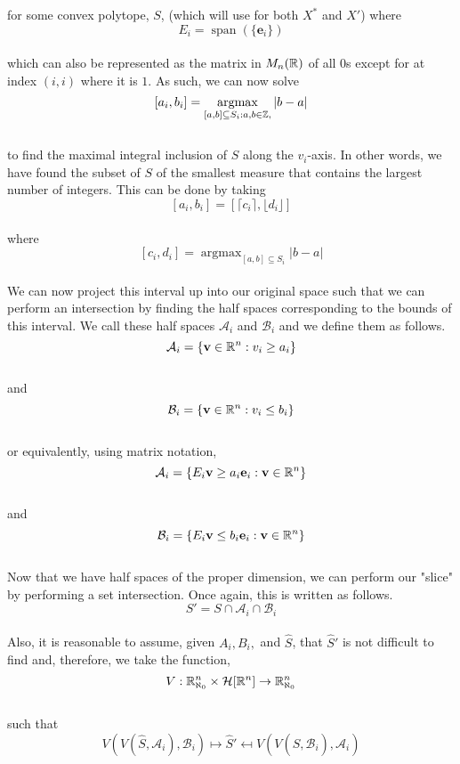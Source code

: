 \documentclass[conference]{IEEEtran}
\numberwithin{equation}{section}
\numberwithin{figure}{section}
\theoremstyle{plain}
\theoremstyle{definition}
\newcommand{\R}{\ensuremath \mathbb{R}}
\newcommand{\Z}{\ensuremath \mathbb{Z}}
\newcommand{\1}{\ensuremath \mathbbm{1}}
\newcommand{\Half}{\ensuremath \mathcal{H}}
\DeclareMathOperator{\vspan}{span}
\DeclareMathOperator{\argmax}{argmax}
\begin{document}
for some convex polytope, $S$, (which will use for both $X^*$ and $X'$) where \\
\[E_i = \vspan(\{\mathbf{e}_i\})\] \\
which can also be represented as the matrix in $M_n(\R)$ of all $0$s except for 
at index $(i,i)$ where it is $1$. As such, we can now solve \\
\[[a_i,b_i] = \argmax_{[a,b] \subseteq S_i : a,b \in \Z, }|b-a|\] \\
to find the maximal integral inclusion of $S$ along the $v_i$-axis. In other 
words, we have found the subset of $S$ of the smallest measure that contains the 
largest number of integers. This can be done by taking \\ 
\[[a_i,b_i] = [\lceil c_i \rceil,\lfloor d_i \rfloor]\] \\
where \\
\[[c_i,d_i] = \argmax_{[a,b] \subseteq S_i}|b-a|\] \\
We can now project this interval up into our original 
space such that we can perform an intersection by finding the half spaces 
corresponding to the bounds of this interval. We call these half spaces 
$\mathcal{A}_i$ and $\mathcal{B}_i$ and we define them as follows. \\
\[\mathcal{A}_i = \{\mathbf{v} \in \R^n : v_i \geq a_i\}\] \\
and \\
\[\mathcal{B}_i = \{\mathbf{v} \in \R^n : v_i \leq b_i\}\] \\
or equivalently, using matrix notation, \\
\[\mathcal{A}_i = \{E_i\mathbf{v} \geq a_i\mathbf{e}_i : \mathbf{v} \in \R^n\}\] \\
and \\
\[\mathcal{B}_i = \{E_i\mathbf{v} \leq b_i\mathbf{e}_i : \mathbf{v} \in \R^n\}\] \\
Now that we have half spaces of the proper dimension, we can perform our "slice" 
by performing a set intersection. Once again, this is written as follows. \\
\[S' = S \cap \mathcal{A}_i \cap \mathcal{B}_i\] \\
Also, it is reasonable to assume, given $A_i,B_i,$ and $\hat{S}$, that $\hat{S}'$ 
is not difficult to find and, therefore, we take the function, \\
\[V: \R^n_{\aleph_0} \times \Half[\R^n] \to \R^n_{\aleph_0}\] \\
such that \\
\[V(V(\hat{S},\mathcal{A}_i),\mathcal{B}_i) \mapsto \hat{S}' \mapsfrom V(V(
\hat{S},\mathcal{B}_i),\mathcal{A}_i)\] \\
\end{document}
